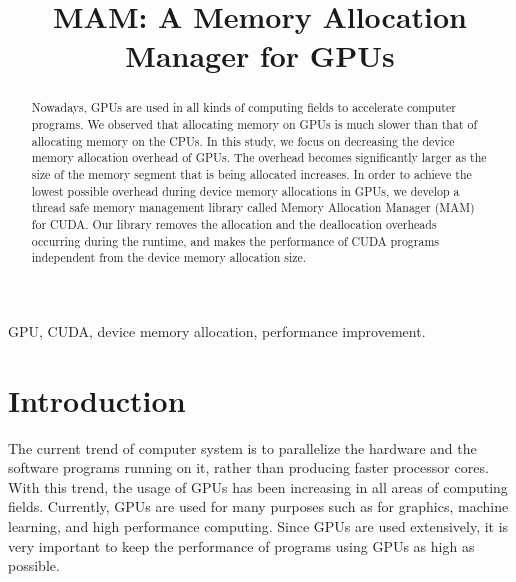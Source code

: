 \documentclass[conference]{IEEEtran}
\begin{document}
\title{MAM: A Memory Allocation Manager for GPUs}

\author{
	\and
}


\maketitle

\begin{abstract}
Nowadays, GPUs are used in all kinds of computing fields to accelerate computer programs. We observed that allocating memory on GPUs is much slower than that of allocating memory on the CPUs. In this study, we focus on decreasing the device memory allocation overhead of GPUs. The overhead becomes significantly larger as the size of the memory segment that is being allocated increases.  In order to achieve the lowest possible overhead during device memory allocations in GPUs, we develop a thread safe memory management library called Memory Allocation Manager (MAM) for CUDA. Our library removes the allocation and the deallocation overheads occurring during the runtime, and makes the performance of CUDA programs independent from the device memory allocation size.
\end{abstract}

\begin{IEEEkeywords}
GPU, CUDA, device memory allocation, performance improvement.
\end{IEEEkeywords}


\IEEEpeerreviewmaketitle



\section{Introduction}
The current trend of computer system is to parallelize the hardware and the software programs running on it, rather than producing faster processor cores. With this trend, the usage of GPUs has been increasing in all areas of computing fields. Currently, GPUs are used for many purposes such as for graphics, machine learning, and high performance computing. Since GPUs are used extensively, it is very important to keep the performance of programs using GPUs as high as possible.
\end{document}
